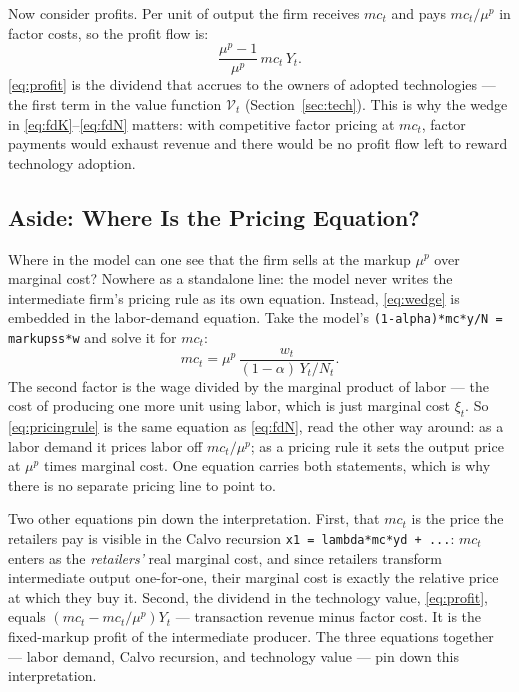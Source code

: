 \documentclass[11pt]{article}
\begin{document}
Now consider profits. Per unit of output the firm receives $mc_t$ and pays
$mc_t/\mu^{p}$ in factor costs, so the profit flow is:
\begin{equation}\label{eq:profit}
    \frac{\mu^{p}-1}{\mu^{p}}\,mc_t\,Y_t.
\end{equation}
\eqref{eq:profit} is the dividend that accrues to the owners of adopted
technologies --- the first term in the value function $\mathcal{V}_t$
(Section~\ref{sec:tech}). This is why the wedge in
\eqref{eq:fdK}--\eqref{eq:fdN} matters: with competitive factor pricing at $mc_t$,
factor payments would exhaust revenue and there would be no profit flow left to
reward technology adoption.

\subsection{Aside: Where Is the Pricing Equation?}

Where in the model can one see that the firm sells at the markup $\mu^{p}$ over
marginal cost? Nowhere as a standalone line: the model never writes the
intermediate firm's pricing rule as its own equation. Instead, \eqref{eq:wedge} is
embedded in the labor-demand equation. Take the model's
\texttt{(1-alpha)*mc*y/N = markupss*w} and solve it for $mc_t$:
\begin{equation}\label{eq:pricingrule}
    mc_t = \mu^{p}\,\frac{w_t}{(1-\alpha)\,Y_t/N_t}.
\end{equation}
The second factor is the wage divided by the marginal product of labor --- the cost
of producing one more unit using labor, which is just marginal cost $\xi_t$. So
\eqref{eq:pricingrule} is the same equation as \eqref{eq:fdN}, read the other way
around: as a labor demand it prices labor off $mc_t/\mu^{p}$; as a pricing rule it
sets the output price at $\mu^{p}$ times marginal cost. One equation carries both
statements, which is why there is no separate pricing line to point to.

Two other equations pin down the interpretation. First, that $mc_t$ is the price
the retailers pay is visible in the Calvo recursion
\texttt{x1 = lambda*mc*yd + ...}: $mc_t$ enters as the \emph{retailers'} real
marginal cost, and since retailers transform intermediate output one-for-one,
their marginal cost is exactly the relative price at which they buy it. Second,
the dividend in the technology value, \eqref{eq:profit}, equals
$(mc_t-mc_t/\mu^{p})Y_t$ --- transaction revenue minus factor cost. It is the
fixed-markup profit of the intermediate producer. The three equations together
--- labor demand, Calvo recursion, and technology value --- pin down this
interpretation.
\end{document}
